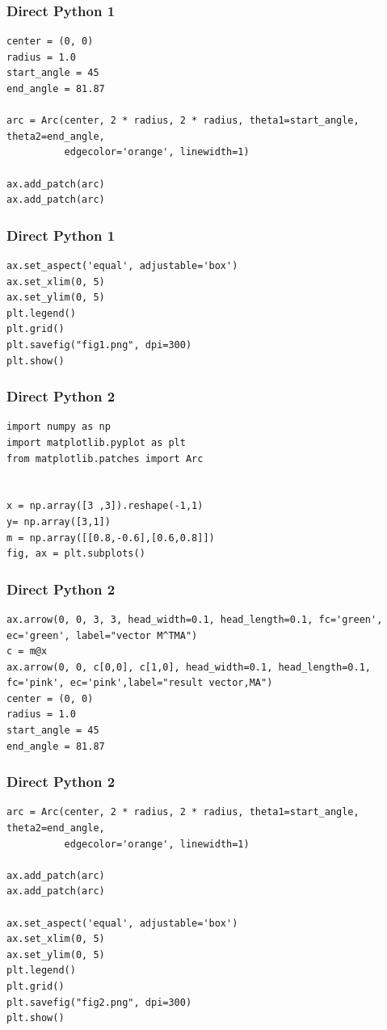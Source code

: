 \documentclass{beamer}
\begin{document}
\begin{frame}[fragile]
\frametitle{Direct Python 1}
\begin{lstlisting}
center = (0, 0)
radius = 1.0
start_angle = 45
end_angle = 81.87

arc = Arc(center, 2 * radius, 2 * radius, theta1=start_angle, theta2=end_angle, 
          edgecolor='orange', linewidth=1)

ax.add_patch(arc)
ax.add_patch(arc)
\end{lstlisting}
\end{frame}
\begin{frame}[fragile]
\frametitle{Direct Python 1}
\begin{lstlisting}
ax.set_aspect('equal', adjustable='box')
ax.set_xlim(0, 5)
ax.set_ylim(0, 5)
plt.legend()
plt.grid()
plt.savefig("fig1.png", dpi=300)
plt.show()

\end{lstlisting}
\end{frame}
\begin{frame}[fragile]
\frametitle{Direct Python 2}
\begin{lstlisting}
import numpy as np
import matplotlib.pyplot as plt
from matplotlib.patches import Arc


x = np.array([3 ,3]).reshape(-1,1)
y= np.array([3,1])
m = np.array([[0.8,-0.6],[0.6,0.8]])
fig, ax = plt.subplots()
\end{lstlisting}
\end{frame}
\begin{frame}[fragile]
\frametitle{Direct Python 2} 
\begin{lstlisting}
ax.arrow(0, 0, 3, 3, head_width=0.1, head_length=0.1, fc='green', ec='green', label="vector M^TMA")
c = m@x
ax.arrow(0, 0, c[0,0], c[1,0], head_width=0.1, head_length=0.1, fc='pink', ec='pink',label="result vector,MA")
center = (0, 0)
radius = 1.0
start_angle = 45
end_angle = 81.87
\end{lstlisting}
\end{frame}
\begin{frame}[fragile]
\frametitle{Direct Python 2} 
\begin{lstlisting}
arc = Arc(center, 2 * radius, 2 * radius, theta1=start_angle, theta2=end_angle, 
          edgecolor='orange', linewidth=1)

ax.add_patch(arc)
ax.add_patch(arc)

ax.set_aspect('equal', adjustable='box')
ax.set_xlim(0, 5)
ax.set_ylim(0, 5)
plt.legend()
plt.grid()
plt.savefig("fig2.png", dpi=300)
plt.show()

\end{lstlisting}
\end{frame}
\end{document}

